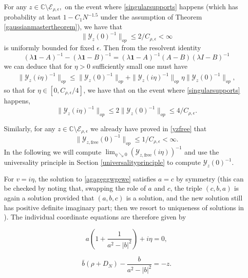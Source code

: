 \documentclass[11pt,reqno]{amsart}
\theoremstyle{plain}
\theoremstyle{remark}
\numberwithin{equation}{section}
\begin{document}
For any $z\in\mathbb{C}\setminus\mathcal{E}_{\rho,\epsilon},$ on the event where \eqref{singularsupports} happens (which has probability at least $1-C_1N^{-1.5}$ under the assumption of Theorem \ref{gaussianmastertheorem}), we have that 
$$
\|\mathcal{Y}_z(0)^{-1}\|_{op}\leq 2/C_{\rho,\epsilon}<\infty
$$
is uniformly bounded for fixed $\epsilon$.
Then from the resolvent identity \begin{equation}\label{resolventequations}(\lambda \mathbf{1}-A)^{-1}-(\lambda \mathbf{1}-B)^{-1}=(\lambda \mathbf{1}-A)^{-1}(A-B)(\lambda I-B)^{-1}\end{equation}
we can deduce that for $\eta>0$ sufficiently small one must have
$$\begin{aligned}
\|\mathcal{Y}_z(i\eta)^{-1}\|_{op}\leq \|\mathcal{Y}_z(0)^{-1}\|_{op}+\|\mathcal{Y}_z(i\eta)^{-1}\|_{op}\eta\|\mathcal{Y}_z(0)^{-1}\|_{op},\end{aligned}$$ so that for $\eta\in[0,C_{\rho,\epsilon}/4]$, we have that on the event where \eqref{singularsupports} happens,
\begin{equation}\label{sufficientsmallwehave}\|\mathcal{Y}_z(i\eta)^{-1}\|_{op}\leq 2\|\mathcal{Y}_z(0)^{-1}\|_{op}\leq 4/C_{\rho,\epsilon}.
\end{equation} 

Similarly, for any $z\in\mathbb{C}\setminus\mathcal{E}_{\rho,\epsilon}$
we already have proved in \eqref{yzfree} that 
$$
\|\mathcal{Y}_{z,\text{free}}(0)^{-1}\|_{op}\leq 1/C_{\rho,\epsilon}<\infty.
$$
In the following we will compute $\lim_{\eta\searrow 0}(\mathcal{Y}_{z,\text{free}}(i\eta))^{-1}$ and use the universality principle in Section \ref{universalityprinciple} to compute $\mathcal{Y}_z(0)^{-1}$.

For $v=i\eta$, the solution to \eqref{agageggwgewe} satisfies $a=c$ by symmetry (this can be checked by noting that, swapping the role of $a$ and $c$, the triple $(c,b,a)$ is again a solution provided that $(a,b,c)$ is a solution, and the new solution still has positive definite imaginary part; then we resort to uniqueness of solutions in \cite{helton2007operator}). The individual coordinate equations are therefore given by

\begin{equation}\label{firstiterate}
a(1+\frac{1}{a^2-|b|^2})+i\eta=0,
\end{equation} 


\begin{equation}\label{seconditerate}
\bar{b}(\rho+D_N)-\frac{b}{a^2-|b|^2}=-z.
\end{equation}
\end{document}
